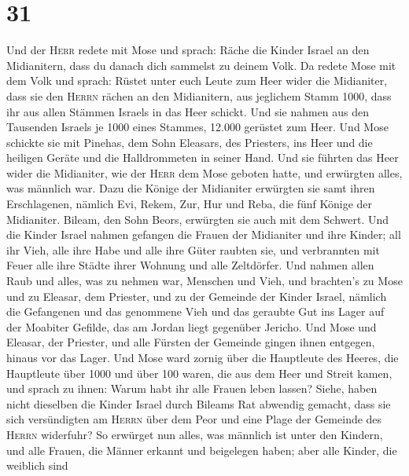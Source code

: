 \hypertarget{section-30}{%
\section{31}\label{section-30}}

 Und der \textsc{Herr} redete mit Mose und sprach:
 Räche die Kinder Israel an den Midianitern, dass du
danach dich sammelst zu deinem Volk.  Da redete Mose mit
dem Volk und sprach: Rüstet unter euch Leute zum Heer wider die
Midianiter, dass sie den \textsc{Herrn} rächen an den Midianitern,
 aus jeglichem Stamm 1000, dass ihr aus allen Stämmen
Israels in das Heer schickt.  Und sie nahmen aus den
Tausenden Israels je 1000 eines Stammes, 12.000 gerüstet zum Heer.
 Und Mose schickte sie mit Pinehas, dem Sohn Eleasars, des
Priesters, ins Heer und die heiligen Geräte und die Halldrommeten in
seiner Hand.  Und sie führten das Heer wider die
Midianiter, wie der \textsc{Herr} dem Mose geboten hatte, und erwürgten
alles, was männlich war.  Dazu die Könige der Midianiter
erwürgten sie samt ihren Erschlagenen, nämlich Evi, Rekem, Zur, Hur und
Reba, die fünf Könige der Midianiter. Bileam, den Sohn Beors, erwürgten
sie auch mit dem Schwert.  Und die Kinder Israel nahmen
gefangen die Frauen der Midianiter und ihre Kinder; all ihr Vieh, alle
ihre Habe und alle ihre Güter raubten sie,  und
verbrannten mit Feuer alle ihre Städte ihrer Wohnung und alle
Zeltdörfer.  Und nahmen allen Raub und alles, was zu
nehmen war, Menschen und Vieh,  und brachten's zu Mose
und zu Eleasar, dem Priester, und zu der Gemeinde der Kinder Israel,
nämlich die Gefangenen und das genommene Vieh und das geraubte Gut ins
Lager auf der Moabiter Gefilde, das am Jordan liegt gegenüber Jericho.
 Und Mose und Eleasar, der Priester, und alle Fürsten der
Gemeinde gingen ihnen entgegen, hinaus vor das Lager. 
Und Mose ward zornig über die Hauptleute des Heeres, die Hauptleute über
1000 und über 100 waren, die aus dem Heer und Streit kamen,
 und sprach zu ihnen: Warum habt ihr alle Frauen leben
lassen?  Siehe, haben nicht dieselben die Kinder Israel
durch Bileams Rat abwendig gemacht, dass sie sich versündigten am
\textsc{Herrn} über dem Peor und eine Plage der Gemeinde des
\textsc{Herrn} widerfuhr?  So erwürget nun alles, was
männlich ist unter den Kindern, und alle Frauen, die Männer erkannt und
beigelegen haben;  aber alle Kinder, die weiblich sind

